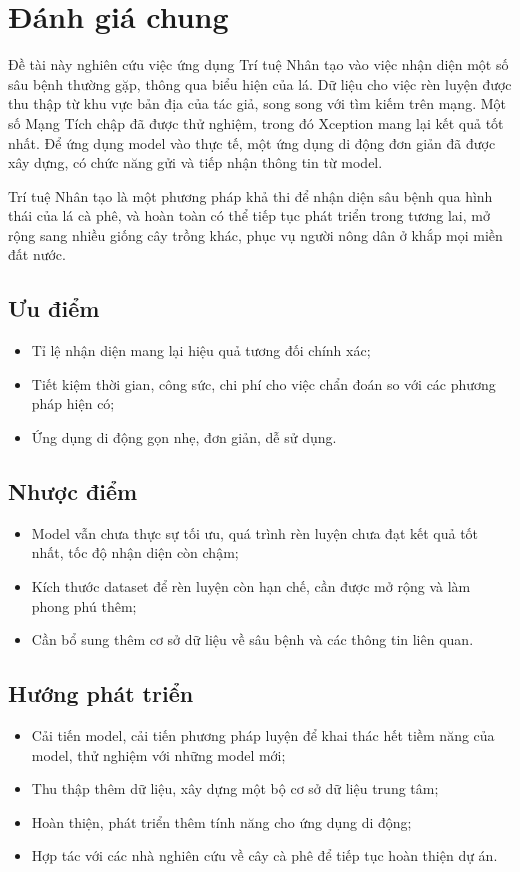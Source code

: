 \documentclass[a4paper,14pt]{extarticle}
\begin{document}
		
\section{Đánh giá chung}
	Đề tài này nghiên cứu việc ứng dụng Trí tuệ Nhân tạo vào việc nhận diện một số sâu bệnh thường gặp, thông qua biểu hiện của lá. Dữ liệu cho việc rèn luyện được thu thập từ khu vực bản địa của tác giả, song song với tìm kiếm trên mạng. Một số Mạng Tích chập đã được thử nghiệm, trong đó Xception mang lại kết quả tốt nhất. Để ứng dụng model vào thực tế, một ứng dụng di động đơn giản đã được xây dựng, có chức năng gửi và tiếp nhận thông tin từ model.
	
	Trí tuệ Nhân tạo là một phương pháp khả thi để nhận diện sâu bệnh qua hình thái của lá cà phê, và hoàn toàn có thể tiếp tục phát triển trong tương lai, mở rộng sang nhiều giống cây trồng khác, phục vụ người nông dân ở khắp mọi miền đất nước.

	\subsection{Ưu điểm}
	\begin{itemize}
		\item Tỉ lệ nhận diện mang lại hiệu quả tương đối chính xác;
		\item Tiết kiệm thời gian, công sức, chi phí cho việc chẩn đoán so với các phương pháp hiện có;
		\item Ứng dụng di động gọn nhẹ, đơn giản, dễ sử dụng.
	\end{itemize}

	\subsection{Nhược điểm}
	\begin{itemize}
		\item Model vẫn chưa thực sự tối ưu, quá trình rèn luyện chưa đạt kết quả tốt nhất, tốc độ nhận diện còn chậm;
		\item Kích thước dataset để rèn luyện còn hạn chế, cần được mở rộng và làm phong phú thêm;
		\item Cần bổ sung thêm cơ sở dữ liệu về sâu bệnh và các thông tin liên quan.
	\end{itemize}

	\subsection{Hướng phát triển}
	\begin{itemize}
		\item Cải tiến model, cải tiến phương pháp luyện để khai thác hết tiềm năng của model, thử nghiệm với những model mới;
		\item Thu thập thêm dữ liệu, xây dựng một bộ cơ sở dữ liệu trung tâm;
		\item Hoàn thiện, phát triển thêm tính năng cho ứng dụng di động;
		\item Hợp tác với các nhà nghiên cứu về cây cà phê để tiếp tục hoàn thiện dự án.
	\end{itemize}
\end{document}
